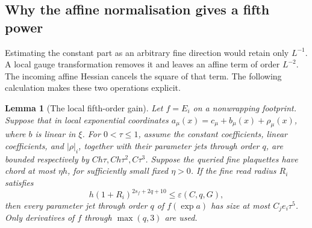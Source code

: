 \documentclass[11pt,reqno]{amsart}
\numberwithin{equation}{section}
\newtheorem{lemma}[theorem]{Lemma}
\theoremstyle{definition}
\theoremstyle{remark}
\begin{document}
\subsection{Why the affine normalisation gives a fifth power}

Estimating the constant part as an arbitrary fine direction
would retain only \(L^{-1}\). A local gauge transformation
removes it and leaves an affine term of order \(L^{-2}\).
The incoming affine Hessian cancels the square of that term.
The following calculation makes these two operations explicit.

\begin{lemma}[The local fifth-order gain]
\label{lem:sharp-fifth-order}
Let \(f=E_i\) on a nonwrapping footprint. Suppose that in
local exponential coordinates
\(a_\mu(x)=c_\mu+b_\mu(x)+\rho_\mu(x)\), where \(b\) is
linear in \(\xi\). For \(0<\tau\le1\), assume the constant
coefficients, linear coefficients, and \(|\rho|_i\), together
with their parameter jets through order \(q\), are bounded
respectively by \(Ch\tau,Ch\tau^2,C\tau^3\).
Suppose the queried fine plaquettes have chord at most
\(\eta h\), for sufficiently small fixed \(\eta>0\).
If the fine read radius \(R_i\) satisfies
\[
        h(1+R_i)^{2s_f+2q+10}\le\varepsilon(C,q,G),
\]
then every parameter jet through order \(q\) of
\(f(\exp a)\) has size at most \(C_je_i\tau^5\).
Only derivatives of \(f\) through \(\max(q,3)\) are used.
\end{lemma}
\end{document}
